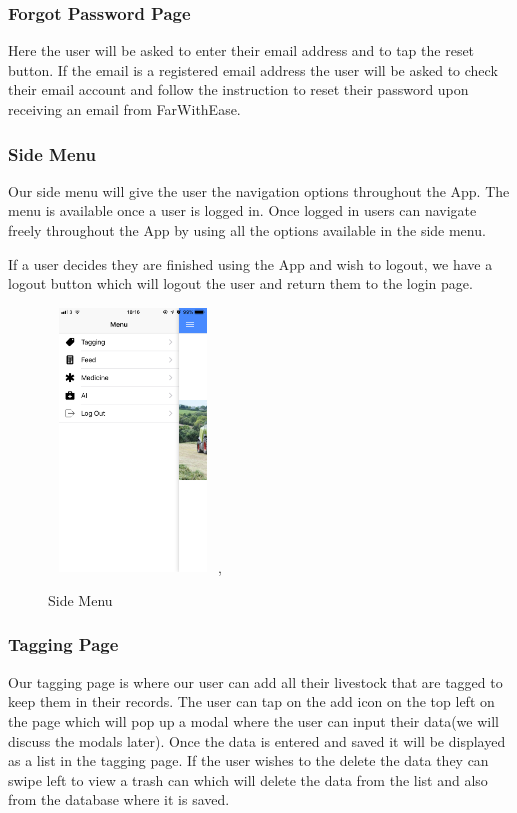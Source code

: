 \documentclass[12pt,a4paper,oneside,openany]{book}
\begin{document}
\subsubsection{Forgot Password Page}
Here the user will be asked to enter their email address and to tap the reset button. If the email is a registered email address the user will be asked to check their email account and follow the instruction to reset their password upon receiving an email from FarWithEase.

\subsubsection{Side Menu}
Our side menu will give the user the navigation options throughout the App. The menu is available once a user is logged in. Once logged in users can navigate freely throughout the App by using all the options available in the side menu.

If a user decides they are finished using the App and wish to logout, we have a logout button which will logout the user and return them to the login page.

\begin{figure}[ht]
\renewcommand\thefigure{5.11}
\centering
\includegraphics[width=4.5cm,height=7cm]{Images/sideMenu.jpg},
\caption{Side Menu}
\label{menu}
\end{figure}


\newpage
\subsubsection{Tagging Page}
Our tagging page is where our user can add all their livestock that are tagged to keep them in their records. The user can tap on the add icon on the top left on the page which will pop up a modal where the user can input their data(we will discuss the modals later). Once the data is entered and saved it will be displayed as a list in the tagging page. If the user wishes to the delete the data they can swipe left to view a trash can which will delete the data from the list and also from the database where it is saved.
\end{document}
